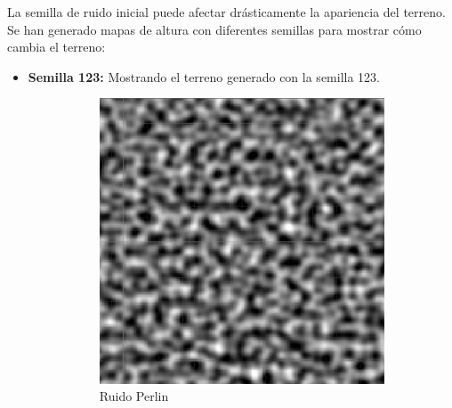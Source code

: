 La semilla de ruido inicial puede afectar drásticamente la apariencia del terreno. Se han generado mapas de altura con diferentes semillas para mostrar cómo cambia el terreno:

\begin{itemize}
    \item \textbf{Semilla 123:} Mostrando el terreno generado con la semilla 123.
    \begin{figure}[ht]
        \begin{subfigure}{0.3\linewidth}
            \centering
            \includegraphics[width=\linewidth]{img/codes/Perlin123.png}
            \caption{Ruido Perlin}
        \end{subfigure}
        \hfill
        \begin{subfigure}{0.3\linewidth}
            \centering

\end{subfigure}
\end{figure}
\end{itemize}
